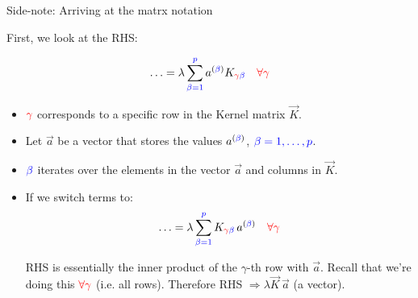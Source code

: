 \begin{frame}{Side-note: Arriving at the matrx notation}



First, we look at the RHS:

\svspace{-5mm}

\begin{equation}
 \ldots = \lambda 
 \sum^{{\color{blue}p}}_{\color{blue}\beta=1} a^{({\color{blue}\beta})} 
K_{{\color{red}\gamma} {\color{blue}\beta}} \quad {\color{red}\forall \gamma}
\end{equation}

\begin{itemize}
\item ${\color{red}\gamma}$ corresponds to a specific row in the Kernel matrix $\vec K$.
\item Let $\vec a$ be a vector that stores the values $a^{({\color{blue}\beta})}$, ${\color{blue}\beta=1,\ldots,p}$.
\item ${\color{blue}\beta}$ iterates over the elements in the vector $\vec a$ and columns in $\vec K$.
\item If we switch terms to:
\svspace{-3mm}
\begin{equation}
 \ldots = \lambda 
 \sum^{{\color{blue}p}}_{\color{blue}\beta=1}  
K_{{\color{red}\gamma} {\color{blue}\beta}} \, a^{({\color{blue}\beta})} \quad {\color{red}\forall \gamma}
\label{eq:rearrangerhs}
\end{equation}

RHS is essentially the inner product of the $\gamma$-th row with $\vec a$.
Recall that we're doing this ${\color{red}\forall \gamma}$ (i.e. all rows). Therefore RHS $\Rightarrow \lambda \vec K \, \vec a$ (a vector). 


\end{itemize}

\end{frame}

